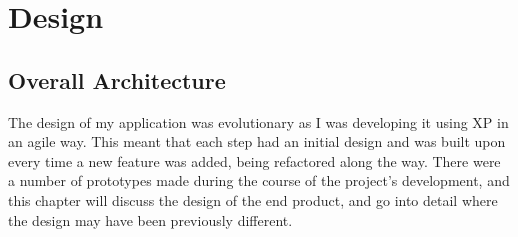 \chapter{Design}




 


\section{Overall Architecture}
The design of my application was evolutionary as I was developing it using XP in an agile way. This meant that each step had an initial design and was built upon every time a new feature was added, being refactored along the way. There were a number of prototypes made during the course of the project's development, and this chapter will discuss the design of the end product, and go into detail where the design may have been previously different.

